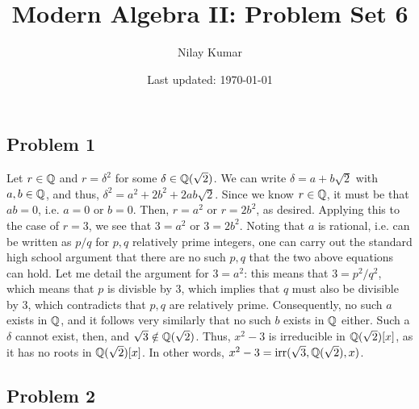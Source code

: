 \documentclass{../../mathnotes}
\title{Modern Algebra II: Problem Set 6}
\author{Nilay Kumar}
\date{Last updated: \today}
\begin{document}
\maketitle

\subsection*{Problem 1}

Let $r\in\mathbb{Q}$ and $r=\delta^2$ for some $\delta\in\mathbb{Q}(\sqrt{2})$. We can write $\delta=a+b\sqrt{2}$ with $a,b\in\mathbb{Q}$,
and thus, $\delta^2=a^2+2b^2+2ab\sqrt{2}$. Since we know $r\in\mathbb{Q}$, it must be that $ab=0$, i.e. $a=0$ or $b=0$.
Then, $r=a^2$ or $r=2b^2$, as desired. Applying this to the case of $r=3$, we see that $3=a^2$ or $3=2b^2$.
Noting that $a$ is rational, i.e. can be written as $p/q$ for $p,q$ relatively prime integers, one can carry out the standard high
school argument that there are no such $p,q$ that the two above equations can hold. Let me detail the argument for
$3=a^2$: this means that $3=p^2/q^2$, which means that $p$ is divisble by 3, which implies that $q$ must also be divisible
by 3, which contradicts that $p,q$ are relatively prime. Consequently, no such $a$ exists in $\mathbb{Q}$, and it follows very
similarly that no such $b$ exists in $\mathbb{Q}$ either.
Such a $\delta$ cannot exist, then, and $\sqrt{3}\notin\mathbb{Q}(\sqrt{2})$. Thus, $x^2-3$ is irreducible in
$\mathbb{Q}(\sqrt{2})[x]$, as it has no roots in $\mathbb{Q}(\sqrt{2})[x]$. In other words, $x^2-3=\operatorname{irr}(\sqrt{3},\mathbb{Q}(\sqrt{2}),x)$.

\subsection*{Problem 2}
\end{document}
